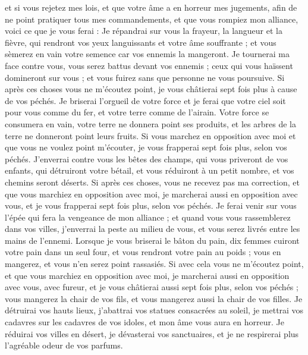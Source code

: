 \begin{multicols}{2}
et si vous rejetez mes lois, et que votre âme a en horreur mes jugements, afin de ne point pratiquer tous mes commandements, et que vous rompiez mon alliance,
voici ce que je vous ferai : Je répandrai sur vous la frayeur, la langueur et la fièvre, qui rendront vos yeux languissants et votre âme souffrante ; et vous sèmerez en vain votre semence car vos ennemis la mangeront.
Je tournerai ma face contre vous, vous serez battus devant vos ennemis ; ceux qui vous haïssent domineront sur vous ; et vous fuirez sans que personne ne vous poursuive.
Si après ces choses vous ne m'écoutez point, je vous châtierai sept fois plus à cause de vos péchés.
Je briserai l'orgueil de votre force et je ferai que votre ciel soit pour vous comme du fer, et votre terre comme de l'airain.
Votre force se consumera en vain, votre terre ne donnera point ses produits, et les arbres de la terre ne donneront point leurs fruits.
Si vous marchez en opposition avec moi et que vous ne voulez point m'écouter, je vous frapperai sept fois plus, selon vos péchés.
J'enverrai contre vous les bêtes des champs, qui vous priveront de vos enfants, qui détruiront votre bétail, et vous réduiront à un petit nombre, et vos chemins seront déserts.
\TextTitle{[La peste]}
Si après ces choses, vous ne recevez pas ma correction, et que vous marchiez en opposition avec moi,
je marcherai aussi en opposition avec vous, et je vous frapperai sept fois plus, selon vos péchés.
Je ferai venir sur vous l'épée qui fera la vengeance de mon alliance ; et quand vous vous rassemblerez dans vos villes, j'enverrai la peste au milieu de vous, et vous serez livrés entre les mains de l'ennemi.
Lorsque je vous briserai le bâton du pain, dix femmes cuiront votre pain dans un seul four, et vous rendront votre pain au poids ; vous en mangerez, et vous n'en serez point rassasiés.
Si avec cela vous ne m'écoutez point, et que vous marchiez en opposition avec moi,
je marcherai aussi en opposition avec vous, avec fureur, et je vous châtierai aussi sept fois plus, selon vos péchés ;
vous mangerez la chair de vos fils, et vous mangerez aussi la chair de vos filles.
Je détruirai vos hauts lieux, j’abattrai vos statues consacrées au soleil, je mettrai vos cadavres sur les cadavres de vos idoles, et mon âme vous aura en horreur.
Je réduirai vos villes en désert, je dévasterai vos sanctuaires, et je ne respirerai plus l’agréable odeur de vos parfums.

\end{multicols}
